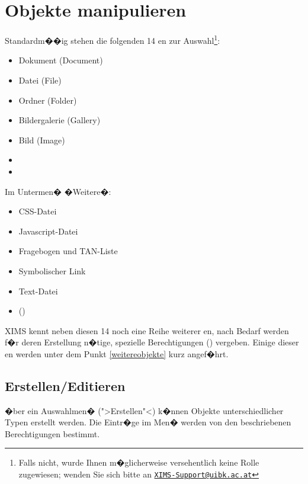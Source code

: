\section{Objekte manipulieren}
\label{objektemanipulieren}

Standardm��ig stehen die folgenden 14 en zur
Auswahl\footnote{Falls nicht, wurde Ihnen m�glicherweise versehentlich
  keine Rolle zugewiesen; wenden Sie sich bitte an
  \href{mailto:XIMS-Support@uibk.ac.at}{\nolinkurl{XIMS-Support@uibk.ac.at}}}:

\begin{itemize}
\item Dokument (Document)
\item Datei (File)
\item Ordner (Folder)
\item Bildergalerie (Gallery)
\item Bild (Image)
\item {}
\item {}
\end{itemize}

Im Untermen� �Weitere�:

\begin{itemize}
\item CSS-Datei
\item Javascript-Datei
\item Fragebogen und TAN-Liste
\item Symbolischer Link
\item Text-Datei
\item {} ()
\end{itemize}

XIMS kennt neben diesen 14 noch eine Reihe weiterer
en, nach Bedarf werden f�r deren Erstellung
n�tige, spezielle Berechtigungen ()
vergeben. Einige dieser en werden unter dem Punkt
\ref{weitereobjekte} kurz angef�hrt.

\subsection{Erstellen/Editieren}
\label{erstelleneditieren}

�ber ein Auswahlmen� (">Erstellen"<) k�nnen Objekte unterschiedlicher Typen erstellt
werden. Die Eintr�ge im Men� werden von den beschriebenen
Berechtigungen bestimmt.\\

